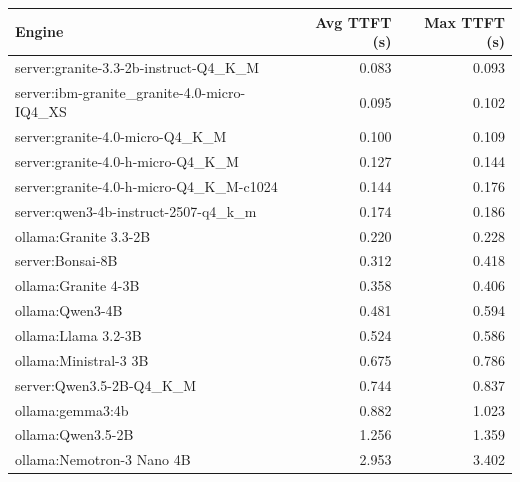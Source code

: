 \begin{tabular}{l|r|r}
\toprule
Engine & Avg TTFT (s) & Max TTFT (s) \\
\midrule
server:granite-3.3-2b-instruct-Q4\_K\_M & 0.083 & 0.093 \\
server:ibm-granite\_granite-4.0-micro-IQ4\_XS & 0.095 & 0.102 \\
server:granite-4.0-micro-Q4\_K\_M & 0.100 & 0.109 \\
server:granite-4.0-h-micro-Q4\_K\_M & 0.127 & 0.144 \\
server:granite-4.0-h-micro-Q4\_K\_M-c1024 & 0.144 & 0.176 \\
server:qwen3-4b-instruct-2507-q4\_k\_m & 0.174 & 0.186 \\
ollama:Granite 3.3-2B & 0.220 & 0.228 \\
server:Bonsai-8B & 0.312 & 0.418 \\
ollama:Granite 4-3B & 0.358 & 0.406 \\
ollama:Qwen3-4B & 0.481 & 0.594 \\
ollama:Llama 3.2-3B & 0.524 & 0.586 \\
ollama:Ministral-3 3B & 0.675 & 0.786 \\
server:Qwen3.5-2B-Q4\_K\_M & 0.744 & 0.837 \\
ollama:gemma3:4b & 0.882 & 1.023 \\
ollama:Qwen3.5-2B & 1.256 & 1.359 \\
ollama:Nemotron-3 Nano 4B & 2.953 & 3.402 \\
\bottomrule
\end{tabular}

